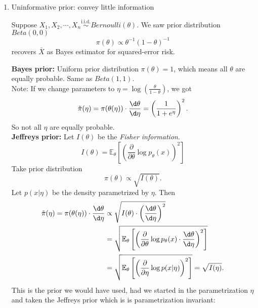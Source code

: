 \documentclass[a4paper]{article}
\begin{document}
\begin{answer}
	\quad
	\begin{enumerate}
		\item Uninformative prior: convey little information
		\begin{eg}
			Suppose $X_1, X_2, \cdots, X_n \stackrel{\text{i.i.d.}}{\sim} Bernoulli(\theta)$. We saw prior distribution $Beta(0,0)$
			\begin{equation*}
				\pi (\theta) \propto \theta^{-1}(1-\theta)^{-1}
			\end{equation*}
			 recovers $\bar{X}$ as Bayes estimator for squared-error risk.
		\end{eg}
		\textbf{Bayes prior:} Uniform prior distribution $\pi(\theta) = 1$, which means all $\theta$ are equally probable. Same as $Beta(1,1)$.\\
		Note: If we change parameters to $\eta = \log(\frac{\theta}{1-\theta})$, we got
		\begin{equation}
			\tilde{\pi}(\eta) = \pi(\theta(\eta)) \cdot \frac{\d \theta}{\d \eta} = \left(\frac{1}{1+e^\eta}\right)^2.
		\end{equation}
		So not all $\eta$ are equally probable.\\
		\textbf{Jeffreys prior:} Let $I(\theta)$ be the \emph{Fisher information}.
		\begin{equation*}
			I(\theta) = \mathbb{E}_\theta\left[\left(\frac{\partial}{\partial \theta} \log p_\theta(x)\right)^2\right]
		\end{equation*}
		Take prior distribution
		\begin{equation*}
			\pi(\theta) \propto \sqrt{I(\theta)}.
		\end{equation*}
		Let $p(x|\eta)$ be the density parametrized by $\eta$. Then
		\begin{equation}
			\begin{aligned}
				\tilde{\pi}(\eta) = \pi(\theta(\eta)) \cdot \frac{\d \theta}{\d \eta}
				& \propto \sqrt{I(\theta) \cdot \left(\frac{\d \theta}{\d \eta}\right)^2} \\
				&= \sqrt{\mathbb{E}_\theta\left[\left(\frac{\partial}{\partial \theta} \log p_\theta(x) \cdot \frac{\d \theta}{\d \eta}\right)^2\right]} \\
				&= \sqrt{\mathbb{E}_\theta\left[\left(\frac{\partial}{\partial \eta} \log p(x|\eta)\right)^2\right]} = \sqrt{I(\eta)}.
			\end{aligned}
		\end{equation}
		This is the prior we would have used, had we started in the parametrization $\eta$ and taken the Jeffreys prior which is is parametrization invariant:

\end{enumerate}
\end{answer}
\end{document}
